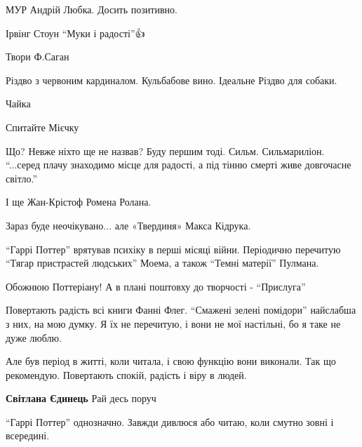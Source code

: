 
МУР Андрій Любка. Досить позитивно.


Ірвінг Стоун \enquote{Муки і радості}👍


Твори Ф.Саган


Різдво з червоним кардиналом.
Кульбабове вино.
Ідеальне Різдво для собаки.


Чайка


Спитайте Мієчку


Що? Невже ніхто ще не назвав? Буду першим тоді. Сильм. Сильмариліон. \enquote{...серед
плачу знаходимо місце для радості, а під тінню смерті живе довгочасне світло.}

І ще Жан-Крістоф Ромена Ролана.


Зараз буде неочікувано... але «Твердиня» Макса Кідрука.


\enquote{Гаррі Поттер} врятував психіку в перші місяці війни. Періодично перечитую
\enquote{Тягар пристрастей людських} Моема, а також \enquote{Темні матерії} Пулмана.


Обожнюю Поттеріану! А в плані поштовху до творчості - \enquote{Прислуга}


Повертають радість всі книги Фанні Флег. \enquote{Смажені зелені помідори} найслабша з
них, на мою думку. Я їх не перечитую, і вони не мої настільні, бо я таке не
дуже люблю.

Але був період в житті, коли читала, і свою функцію вони виконали. Так що
рекомендую. Повертають спокій, радість і віру в людей.

\begin{itemize} %
\textbf{Світлана Єдинець} Рай десь поруч 🖤
\end{itemize} %


\enquote{Гаррі Поттер} однозначно. Завжди дивлюся або читаю, коли смутно зовні
і всередині.

